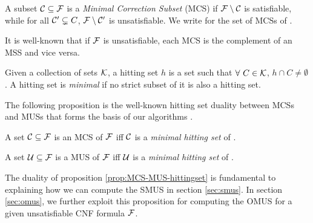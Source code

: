 \begin{definition}
    A subset $\mathcal{C} \subseteq \mathcal{F}$ is a \emph{Minimal Correction Subset} (MCS) if $\mathcal{F}\setminus\mathcal{C}$ is satisfiable, while for all 
    $ \mathcal{C}' \subsetneq C$,  $\mathcal{F} \setminus \mathcal{C}'$ is unsatisfiable.
    We write \mcses{\F} for the set of MCSs of \F. 
\end{definition}

It is well-known that if $\mathcal{F}$ is unsatisfiable, each  MCS is the complement of an MSS and vice versa. 

\begin{definition}\label{def:minimal-hs}
    Given a collection of sets $\mathcal{K}$, a hitting set $h$ is a set such that $\forall \ C \in \mathcal{K}$, $h \cap C \neq \emptyset$. A hitting set is \emph{minimal} if no strict subset of it is also a hitting set. 
\end{definition}



The following proposition is the well-known hitting set duality  between MCSs and MUSs that forms the basis of our algorithms \cite{DBLP:journals/jar/LiffitonS08,ai/Reiter87}.

\begin{proposition}\label{prop:MCS-MUS-hittingset}
%     
    A set  $\mathcal{C} \subseteq \mathcal{F}$ is an MCS of $ \mathcal{F}$ iff  $\mathcal{C}$ is a \emph{minimal hitting set} of .

    A set  $\mathcal{U} \subseteq \mathcal{F}$ is a MUS of $ \mathcal{F}$ iff  $\mathcal{U}$ is a \emph{minimal hitting set} of .
\end{proposition}
 
The duality of proposition \ref{prop:MCS-MUS-hittingset} is fundamental to explaining how we can compute the SMUS in section \ref{sec:smus}. 
In section \ref{sec:omus}, we further exploit this proposition for computing the OMUS for a given unsatisfiable CNF formula $\mathcal{F}$.
